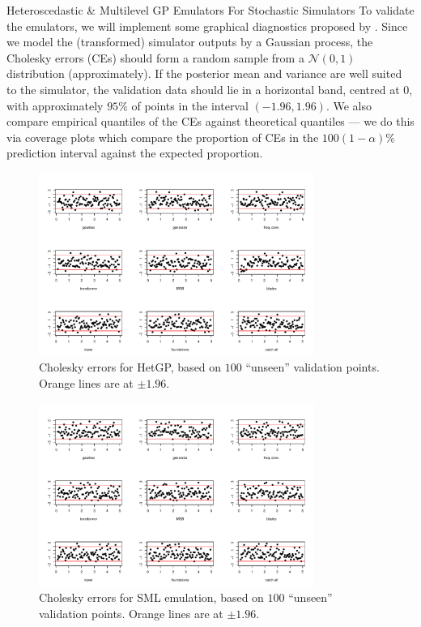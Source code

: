 \begin{chapter}{Heteroscedastic \& Multilevel GP Emulators For Stochastic Simulators\label{Ch:Hetsml}}
To validate the emulators, we will implement some graphical diagnostics proposed by \citet{Bastos09}. Since we model the (transformed) simulator outputs by a Gaussian process, the Cholesky errors (CEs) should form a random sample from a $\mathcal{N}(0, 1)$ distribution (approximately). If the posterior mean and variance are well suited to the simulator, the validation data should lie in a horizontal band, centred at $0$, with approximately $95\%$ of points in the interval $(-1.96, 1.96)$. We also compare empirical quantiles of the CEs against theoretical quantiles --- we do this via coverage plots which compare the proportion of CEs in the $100(1-\alpha)\%$ prediction interval against the expected proportion.
\begin{figure}[!ht]
  \centering
    \includegraphics[width = 0.8\textwidth]{sml-het-fig2/het-resids-new3.pdf}
    \caption{Cholesky errors for HetGP, based on $100$ ``unseen'' validation points. Orange lines are at $\pm 1.96$.\label{Fig:het-resids}}
\end{figure}
\begin{figure}[!ht]
  \centering
\includegraphics[width = 0.8\textwidth]{sml-het-fig2/sml-resids-new3.pdf}
\caption{Cholesky errors for SML emulation, based on $100$ ``unseen'' validation points. Orange lines are at $\pm 1.96$.\label{Fig:sml-resids}}

\end{figure}
\end{chapter}
